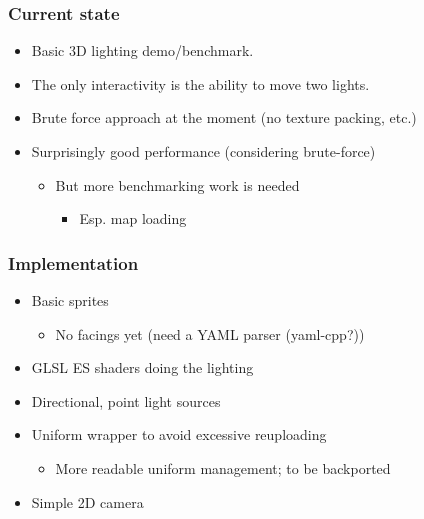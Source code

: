 \documentclass[ignorenonframetext]{beamer}
\begin{document}
\begin{frame}[fragile]
\frametitle{Current state}

\begin{itemize}

\item Basic 3D lighting demo/benchmark.

\item The only interactivity is the ability to move two lights.

\item Brute force approach at the moment (no texture packing, etc.)

\item Surprisingly good performance (considering brute-force)
\begin{itemize}

\item But more benchmarking work is needed
\begin{itemize}

\item Esp. map loading
\end{itemize}
\end{itemize}
\end{itemize}
\end{frame}

\begin{frame}[fragile]
\frametitle{Implementation}

\begin{itemize}

\item Basic sprites
\begin{itemize}

\item No facings yet (need a YAML parser (yaml-cpp?))
\end{itemize}

\item GLSL ES shaders doing the lighting

\item Directional, point light sources

\item Uniform wrapper to avoid excessive reuploading
\begin{itemize}

\item More readable uniform management; to be backported
\end{itemize}

\item Simple 2D camera
\end{itemize}
\end{frame}
\end{document}
